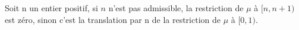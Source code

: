 
\begin{prop}
	Soit n un entier positif, si $n$ n'est pas admissible, la restriction de
	$\mu$ à $[n, n+1)$ est z\'ero, sinon c'est la translation par n de la
	restriction de $\mu$ à $[0, 1)$.
\end{prop}
